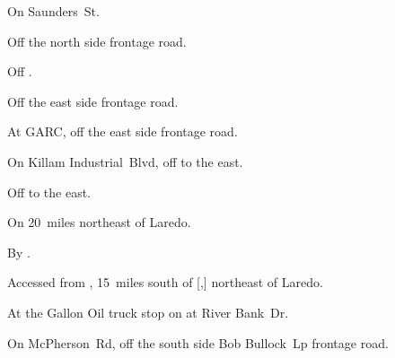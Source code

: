 
\begin{LocationList}

On  Saunders~St.

Off the north side  frontage road.

\Location{\GarageHQ \Garage}
Off .

Off the east side  frontage road.

At GARC, off the east side  frontage road.

On Killam Industrial~Blvd, off  to the east.

Off  to the east.

On  20~miles northeast of Laredo.

\Location{\RecruitmentAgency \Recruitment}
By .

Accessed from , 15~miles south of [,] northeast of Laredo.

At the Gallon Oil truck stop on  at River Bank~Dr.

On McPherson~Rd, off the south side   Bob Bullock~Lp frontage road.

\end{LocationList}

